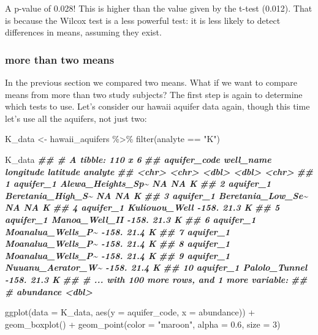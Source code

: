 \documentclass[
]{krantz}
\newenvironment{Shaded}{\begin{snugshade}}{\end{snugshade}}
\newcommand{\AttributeTok}[1]{\textcolor[rgb]{0.77,0.63,0.00}{#1}}
\newcommand{\DecValTok}[1]{\textcolor[rgb]{0.00,0.00,0.81}{#1}}
\newcommand{\DocumentationTok}[1]{\textcolor[rgb]{0.56,0.35,0.01}{\textbf{\textit{#1}}}}
\newcommand{\FloatTok}[1]{\textcolor[rgb]{0.00,0.00,0.81}{#1}}
\newcommand{\FunctionTok}[1]{\textcolor[rgb]{0.00,0.00,0.00}{#1}}
\newcommand{\NormalTok}[1]{#1}
\newcommand{\OtherTok}[1]{\textcolor[rgb]{0.56,0.35,0.01}{#1}}
\newcommand{\SpecialCharTok}[1]{\textcolor[rgb]{0.00,0.00,0.00}{#1}}
\newcommand{\StringTok}[1]{\textcolor[rgb]{0.31,0.60,0.02}{#1}}
\begin{document}
A p-value of 0.028! This is higher than the value given by the t-test (0.012). That is because the Wilcox test is a less powerful test: it is less likely to detect differences in means, assuming they exist.

\hypertarget{more-than-two-means}{%
\subsubsection{more than two means}\label{more-than-two-means}}

In the previous section we compared two means. What if we want to compare means from more than two study subjects? The first step is again to determine which tests to use. Let's consider our hawaii aquifer data again, though this time let's use all the aquifers, not just two:

\begin{Shaded}
\begin{Highlighting}[]
\NormalTok{K\_data }\OtherTok{\textless{}{-}}\NormalTok{ hawaii\_aquifers }\SpecialCharTok{\%\textgreater{}\%}
  \FunctionTok{filter}\NormalTok{(analyte }\SpecialCharTok{==} \StringTok{"K"}\NormalTok{)}

\NormalTok{K\_data}
\DocumentationTok{\#\# \# A tibble: 110 x 6}
\DocumentationTok{\#\#    aquifer\_code well\_name         longitude latitude analyte}
\DocumentationTok{\#\#    \textless{}chr\textgreater{}        \textless{}chr\textgreater{}                 \textless{}dbl\textgreater{}    \textless{}dbl\textgreater{} \textless{}chr\textgreater{}  }
\DocumentationTok{\#\#  1 aquifer\_1    Alewa\_Heights\_Sp\textasciitilde{}       NA      NA   K      }
\DocumentationTok{\#\#  2 aquifer\_1    Beretania\_High\_S\textasciitilde{}       NA      NA   K      }
\DocumentationTok{\#\#  3 aquifer\_1    Beretania\_Low\_Se\textasciitilde{}       NA      NA   K      }
\DocumentationTok{\#\#  4 aquifer\_1    Kuliouou\_Well         {-}158.     21.3 K      }
\DocumentationTok{\#\#  5 aquifer\_1    Manoa\_Well\_II         {-}158.     21.3 K      }
\DocumentationTok{\#\#  6 aquifer\_1    Moanalua\_Wells\_P\textasciitilde{}     {-}158.     21.4 K      }
\DocumentationTok{\#\#  7 aquifer\_1    Moanalua\_Wells\_P\textasciitilde{}     {-}158.     21.4 K      }
\DocumentationTok{\#\#  8 aquifer\_1    Moanalua\_Wells\_P\textasciitilde{}     {-}158.     21.4 K      }
\DocumentationTok{\#\#  9 aquifer\_1    Nuuanu\_Aerator\_W\textasciitilde{}     {-}158.     21.4 K      }
\DocumentationTok{\#\# 10 aquifer\_1    Palolo\_Tunnel         {-}158.     21.3 K      }
\DocumentationTok{\#\# \# ... with 100 more rows, and 1 more variable:}
\DocumentationTok{\#\# \#   abundance \textless{}dbl\textgreater{}}

\FunctionTok{ggplot}\NormalTok{(}\AttributeTok{data =}\NormalTok{ K\_data, }\FunctionTok{aes}\NormalTok{(}\AttributeTok{y =}\NormalTok{ aquifer\_code, }\AttributeTok{x =}\NormalTok{ abundance)) }\SpecialCharTok{+}
  \FunctionTok{geom\_boxplot}\NormalTok{() }\SpecialCharTok{+}
  \FunctionTok{geom\_point}\NormalTok{(}\AttributeTok{color =} \StringTok{"maroon"}\NormalTok{, }\AttributeTok{alpha =} \FloatTok{0.6}\NormalTok{, }\AttributeTok{size =} \DecValTok{3}\NormalTok{)}
\end{Highlighting}
\end{Shaded}
\end{document}

